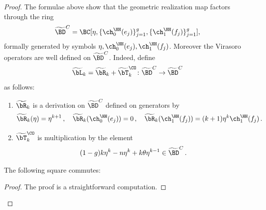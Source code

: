 \begin{proof}
The formulae above show that the geometric realization map factors through the ring
\[\widetilde\BD^C=\BC[\eta, \{\ch_0^\HH(e_j)\}_{j=1}^g, \{\ch_1^\HH(f_j)\}_{j=1}^g],\]
formally generated by symbols $\eta, \ch_0^\HH(e_j), \ch_1^\HH(f_j)$. Moreover the Virasoro operators are well defined on $\widetilde\BD^C$. Indeed, define
\[\widetilde \bL_k=\widetilde \bR_k+\widetilde \bT_k^\CO\colon \widetilde\BD^C\to \widetilde\BD^C\]
as follows:
\begin{enumerate}
    \item $\widetilde \bR_k$ is a derivation on $\widetilde \BD^C$ defined on generators by
\[
        \widetilde \bR_k(\eta)=\eta^{k+1}\, , \quad     \widetilde \bR_k(\ch_0^\HH(e_j))=0\, , \quad \widetilde \bR_k(\ch_1^\HH(f_j))=(k+1)\eta^k\ch_1^\HH(f_j)\,.
        \]
    \item $\widetilde \bT_k^\CO$ is multiplication by the element
    \[(1-g)k\eta^k-n \eta^k+k \theta \eta^{k-1}\in \widetilde \BD^C\,.\]
    \end{enumerate}


    \begin{claim}
\notready
    The following square commutes:


    \end{claim}
    \begin{proof}
    The proof is a straightforward computation.\qedhere
    \end{proof}


\end{proof}
